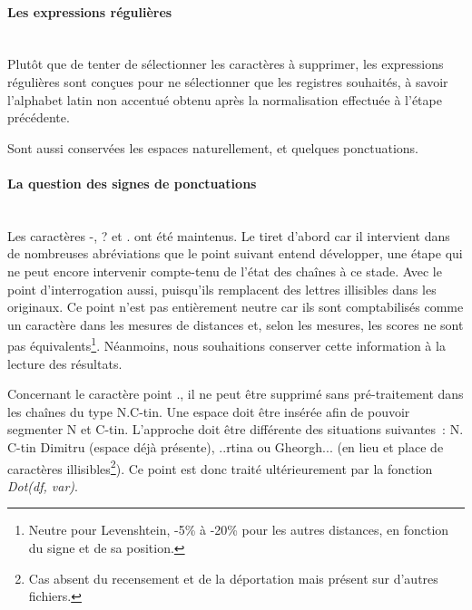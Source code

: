 \documentclass[a4paper,12pt,twoside]{book}
\begin{document}
	                \paragraph{Les expressions régulières}\mbox{}\\
	                
	                Plutôt que de tenter de sélectionner les caractères à supprimer, les expressions régulières sont conçues pour ne sélectionner que les registres souhaités, à savoir l'alphabet latin non accentué obtenu après la normalisation effectuée à l'étape précédente.
	                
	                Sont aussi conservées les espaces naturellement, et quelques ponctuations.
	                
	                \paragraph{La question des signes de ponctuations}\mbox{}\\
	                
	                Les caractères \og{}-\fg{}, \og{}?\fg{} et \og{}.\fg{} ont été maintenus.
	                Le tiret d'abord car il intervient dans de nombreuses abréviations que le point suivant entend développer, une étape qui ne peut encore intervenir compte-tenu de l'état des chaînes à ce stade.
	                Avec le point d'interrogation aussi, puisqu'ils remplacent des lettres illisibles dans les originaux. Ce point n'est pas entièrement neutre car ils sont comptabilisés comme un caractère dans les mesures de distances et, selon les mesures, les scores ne sont pas équivalents\footnote{Neutre pour Levenshtein, -5\% à -20\% pour les autres distances, en fonction du signe et de sa position.}. Néanmoins, nous souhaitions conserver cette information à la lecture des résultats.

	                Concernant le caractère point \og{}.\fg{}, il ne peut être supprimé sans pré-traitement dans les chaînes du type \og{}N.C-tin\fg{}. Une espace doit être insérée afin de pouvoir segmenter \og{}N\fg{} et \og{}C-tin\fg{}.
	                L'approche doit être différente des situations suivantes~: \og{}N. C-tin Dimitru\fg{} (espace déjà présente), \og{}..rtina\fg{} ou \og{}Gheorgh...\fg{} (en lieu et place de caractères illisibles\footnote{Cas absent du recensement et de la déportation mais présent sur d'autres fichiers.}). Ce point est donc traité ultérieurement par la fonction \textit{Dot(df, var)}.
	            
\end{document}
